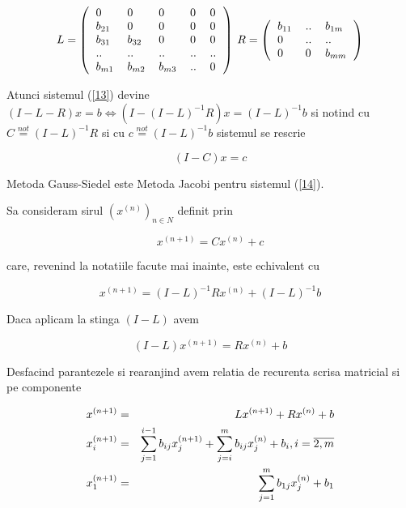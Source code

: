 \documentclass[a4paper,twoside]{book}
\begin{document}
\begin{equation*}
L=\left( 
\begin{tabular}{lllll}
0 & 0 & 0 & 0 & 0 \\ 
$b_{21}$ & 0 & 0 & 0 & 0 \\ 
$b_{31}$ & $b_{32}$ & 0 & 0 & 0 \\ 
.. & .. & .. & .. & .. \\ 
$b_{m1}$ & $b_{m2}$ & $b_{m3}$ & .. & 0%
\end{tabular}%
\right) \:R=\left( 
\begin{tabular}{lll}
$b_{11}$ & .. & $b_{1m}$ \\ 
0 & .. & .. \\ 
0 & 0 & $b_{mm}$%
\end{tabular}%
\right)
\end{equation*}

Atunci sistemul (\ref{13}) devine $(I-L-R)x=b\Leftrightarrow
(I-(I-L)^{-1}R)x=(I-L)^{-1}b$ si notind cu $C\overset{not}{=}(I-L)^{-1}R$ si
cu $c\overset{not}{=}(I-L)^{-1}b$ sistemul se rescrie

\begin{equation}
(I-C)x=c  \label{14}
\end{equation}

Metoda Gauss-Siedel este Metoda Jacobi pentru sistemul (\ref{14}).

Sa consideram sirul $(x^{(n)})_{n\in N}$ definit prin

\begin{equation*}
x^{(n+1)}=Cx^{(n)}+c
\end{equation*}

care, revenind la notatiile facute mai inainte, este echivalent cu

\begin{equation*}
x^{(n+1)}=(I-L)^{-1}Rx^{(n)}+(I-L)^{-1}b
\end{equation*}

Daca aplicam la stinga $(I-L)$ avem

\begin{equation*}
(I-L)x^{(n+1)}=Rx^{(n)}+b
\end{equation*}

Desfacind parantezele si rearanjind avem relatia de recurenta scrisa
matricial si pe componente

\begin{eqnarray}
x^{(n+1)} &=&Lx^{(n+1)}+Rx^{(n)}+b  \label{15} \\
x_{i}^{(n+1)}
&=&\sum_{j=1}^{i-1}b_{ij}x_{j}^{(n+1)}+%
\sum_{j=i}^{m}b_{ij}x_{j}^{(n)}+b_{i},i=\overline{2,m}  \notag \\
x_{1}^{(n+1)} &=&\sum_{j=1}^{m}b_{1j}x_{j}^{(n)}+b_{1}  \notag
\end{eqnarray}
\end{document}
